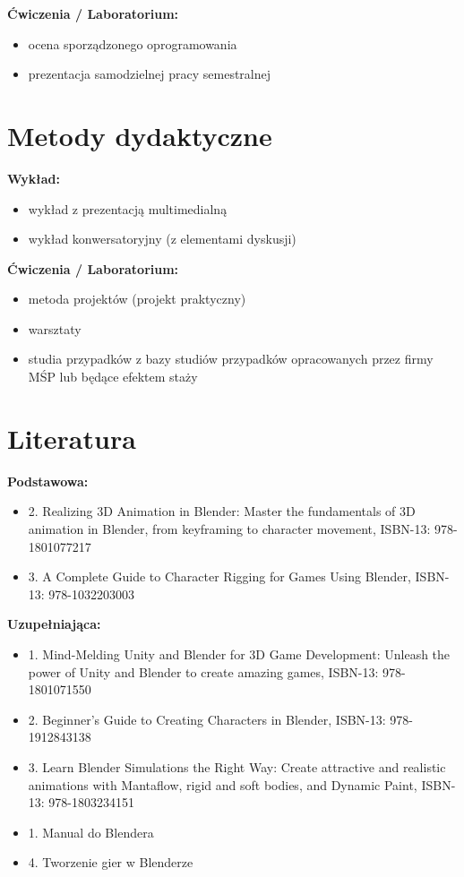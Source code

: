 \documentclass[12pt, a4paper]{article}
\begin{document}
\textbf{Ćwiczenia / Laboratorium:}
\begin{itemize}
  \item ocena sporządzonego oprogramowania
  \item prezentacja samodzielnej pracy semestralnej
\end{itemize}


\section{Metody dydaktyczne}

\textbf{Wykład:}
\begin{itemize}
  \item wykład z prezentacją multimedialną
  \item wykład konwersatoryjny (z elementami dyskusji)
\end{itemize}
\vspace{4pt}
\textbf{Ćwiczenia / Laboratorium:}
\begin{itemize}
  \item metoda projektów (projekt praktyczny)
  \item warsztaty
  \item studia przypadków z bazy studiów przypadków opracowanych przez firmy MŚP lub będące efektem staży
\end{itemize}
\vspace{4pt}


\section{Literatura}

\textbf{Podstawowa:}
\begin{itemize}
  \item 2. Realizing 3D Animation in Blender: Master the fundamentals of 3D animation in Blender, from keyframing to character movement, ISBN-13: 978-1801077217
  \item 3. A Complete Guide to Character Rigging for Games Using Blender, ISBN-13: 978-1032203003
\end{itemize}

\textbf{Uzupełniająca:}
\begin{itemize}
  \item 1. Mind-Melding Unity and Blender for 3D Game Development: Unleash the power of Unity and Blender to create amazing games, ISBN-13: 978-1801071550
  \item 2. Beginner’s Guide to Creating Characters in Blender, ISBN-13: 978-1912843138
  \item 3. Learn Blender Simulations the Right Way: Create attractive and realistic animations with Mantaflow, rigid and soft bodies, and Dynamic Paint, ISBN-13: 978-1803234151
  \item 1. Manual do Blendera
  \item 4. Tworzenie gier w Blenderze
\end{itemize}
\end{document}
